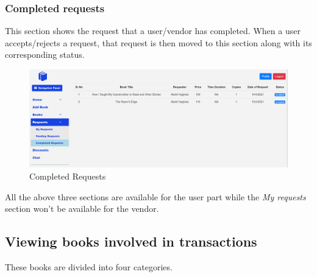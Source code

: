 \documentclass[conference]{IEEEtran}
\begin{document}
\subsubsection{Completed requests}
This section shows the request that a user/vendor has completed. When a user accepts/rejects a request, that request is then moved to this section along with its corresponding status. 
\begin{figure}[h]
     \centering
     \includegraphics[scale=0.20,margin=2,frame]{completedrequests.PNG}
     \caption{Completed Requests}
     \label{fig:completedrequests}
 \end{figure}

All the above three sections are available for the user part while the \emph{My requests} section won't be available for the vendor.

\subsection{Viewing books involved in transactions}
These books are divided into four categories.
\end{document}
